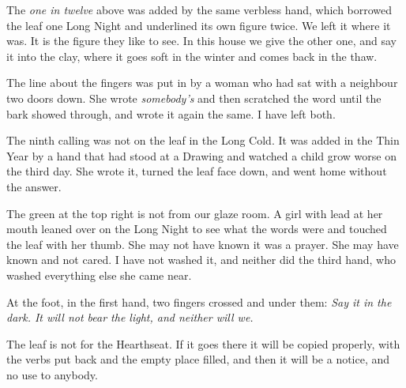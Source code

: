\documentclass{design/chronicle}
\begin{document}
The \emph{one in twelve} above was added by the same verbless hand, which borrowed the leaf one Long Night and underlined its own figure twice. We left it where it was. It is the figure they like to see. In this house we give the other one, and say it into the clay, where it goes soft in the winter and comes back in the thaw.

The line about the fingers was put in by a woman who had sat with a neighbour two doors down. She wrote \emph{somebody’s} and then scratched the word until the bark showed through, and wrote it again the same. I have left both.

The ninth calling was not on the leaf in the Long Cold. It was added in the Thin Year by a hand that had stood at a Drawing and watched a child grow worse on the third day. She wrote it, turned the leaf face down, and went home without the answer.

The green at the top right is not from our glaze room. A girl with lead at her mouth leaned over on the Long Night to see what the words were and touched the leaf with her thumb. She may not have known it was a prayer. She may have known and not cared. I have not washed it, and neither did the third hand, who washed everything else she came near.

At the foot, in the first hand, two fingers crossed and under them: \emph{Say it in the dark. It will not bear the light, and neither will we.}

The leaf is not for the Hearthseat. If it goes there it will be copied properly, with the verbs put back and the empty place filled, and then it will be a notice, and no use to anybody.
\end{document}
